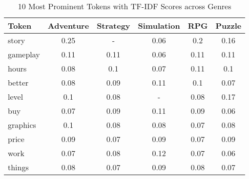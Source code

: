 \begin{table}[h]
    \centering
    \begin{tabular}{l|c|c|c|c|c}
        Token & Adventure & Strategy & Simulation & RPG & Puzzle \\
        \hline
        story & 0.25 & - & 0.06 & 0.2 & 0.16 \\
        gameplay & 0.11 & 0.11 & 0.06 & 0.11 & 0.11 \\
        hours & 0.08 & 0.1 & 0.07 & 0.11 & 0.1 \\
        better & 0.08 & 0.09 & 0.11 & 0.1 & 0.07 \\
        level & 0.1 & 0.08 & - & 0.08 & 0.17 \\
        buy & 0.07 & 0.09 & 0.11 & 0.09 & 0.06 \\
        graphics & 0.1 & 0.08 & 0.08 & 0.07 & 0.08 \\
        price & 0.09 & 0.07 & 0.09 & 0.07 & 0.09 \\
        work & 0.07 & 0.08 & 0.12 & 0.07 & 0.06 \\
        things & 0.08 & 0.07 & 0.09 & 0.08 & 0.07
    \end{tabular}
    \caption{10 Most Prominent Tokens with TF-IDF Scores across Genres}
    \label{tab:prominent_tokens}
\end{table}